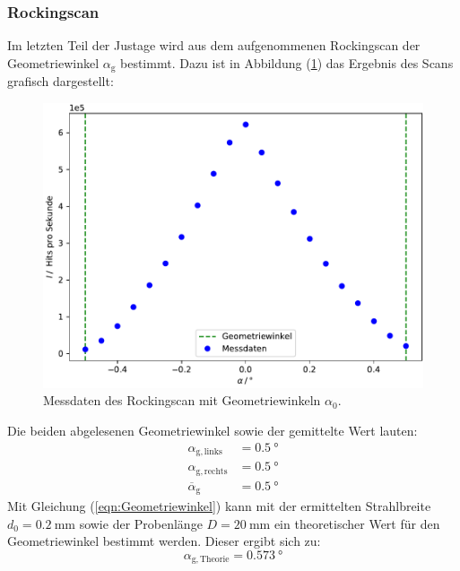 \subsubsection{Rockingscan}
Im letzten Teil der Justage wird aus dem aufgenommenen Rockingscan der Geometriewinkel $\alpha_\mathrm{g}$ bestimmt.
Dazu ist in Abbildung (\ref{fig:rockscan}) das Ergebnis des Scans grafisch dargestellt:
\begin{figure}[h!]
  \centering
  \includegraphics[scale=0.7]{fig/plot_rockingscan.pdf}
  \caption{Messdaten des Rockingscan mit Geometriewinkeln $\alpha_\mathrm{0}$.}
  \label{fig:rockscan}
\end{figure}
\FloatBarrier
\noindent Die beiden abgelesenen Geometriewinkel sowie der gemittelte Wert lauten:
\begin{align*}
  \alpha_\mathrm{g,links} &= \SI{0.5}{\degree} \\
  \alpha_\mathrm{g,rechts} &= \SI{0.5}{\degree} \\
  \overline{\alpha}_\mathrm{g} &= \SI{0.5}{\degree}
\end{align*}
Mit Gleichung (\ref{eqn:Geometriewinkel}) kann mit der ermittelten Strahlbreite $d_\mathrm{0}=\SI{0.2}{\milli\meter}$ sowie der Probenlänge $D=\SI{20}{\milli\meter}$ ein theoretischer Wert
für den Geometriewinkel bestimmt werden. Dieser ergibt sich zu:
\begin{equation*}
  \alpha_\mathrm{g,Theorie} = \SI{0.573}{\degree}
\end{equation*}
